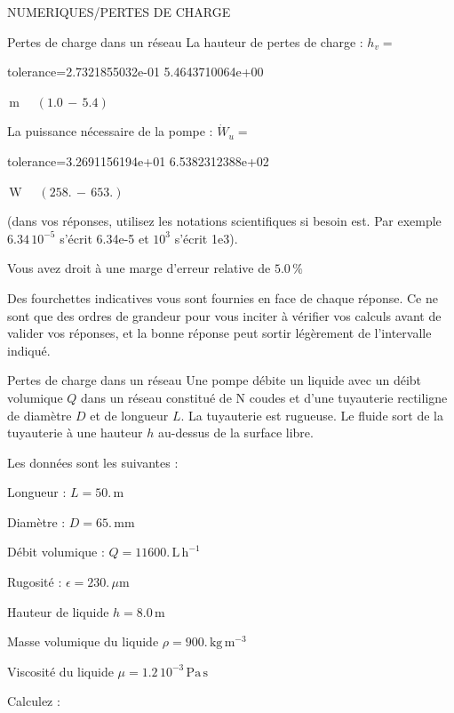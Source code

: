 \documentclass[12pt]{article}
\begin{document}
\begin{quiz}{NUMERIQUES/PERTES DE CHARGE}
\begin{cloze}{Pertes de charge dans un réseau}
La hauteur de pertes de charge : $h_v =  $
\begin{numerical}[points=1] 
\item[tolerance={2.7321855032e-01}] 5.4643710064e+00 
\end{numerical} 
 $\,  \mathrm{m}$ 
 $ \quad (1.0 \, - \, 5.4) $ 

La puissance nécessaire de la pompe : $\dot{W}_u =  $
\begin{numerical}[points=1] 
\item[tolerance={3.2691156194e+01}] 6.5382312388e+02 
\end{numerical} 
 $\,  \mathrm{W}$ 
 $ \quad (258. \, - \, 653.) $ 

(dans vos réponses, utilisez les notations scientifiques si besoin est. Par exemple $6.34\, 10^{-5}$ s'écrit 6.34e-5 et $10^{3}$ s'écrit 1e3).

Vous avez droit à une marge d'erreur relative de $5.0\, \% $

Des fourchettes indicatives vous sont fournies en face de chaque réponse. Ce ne sont que des ordres de grandeur pour vous inciter à vérifier vos calculs avant de valider vos réponses, et la bonne réponse peut sortir légèrement de l'intervalle indiqué.

\end{cloze} 


 \begin{cloze}{Pertes de charge dans un réseau} 
Une pompe débite un liquide avec un déibt volumique $Q$ dans un réseau constitué de N coudes et d'une tuyauterie rectiligne de diamètre $D$ et de longueur $L$. La tuyauterie est rugueuse. Le fluide sort de la tuyauterie à une hauteur $h$ au-dessus de la surface libre.

Les données sont les suivantes :

Longueur : $L = 50.\,  \mathrm{m} $

Diamètre : $D = 65.\,  \mathrm{mm} $

Débit volumique : $Q = 11600.\,  \mathrm{L}\,  \mathrm{h}^{-1} $

Rugosité : $\epsilon = 230.\, \mu \mathrm{m} $

Hauteur de liquide $h = 8.0\,  \mathrm{m} $

Masse volumique du liquide $\rho = 900.\,  \mathrm{kg}\,  \mathrm{m}^{-3} $

Viscosité du liquide $\mu =  1.2 \, 10^{-3} \,  \mathrm{Pa}\,  \mathrm{s} $

 

Calculez :


\end{cloze}
\end{quiz}
\end{document}
